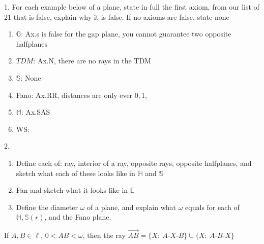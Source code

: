 \documentclass{report}
\begin{document}
    \pagebreak 
    \begin{mdframed}
        1. For each example below of a plane, state in full the first axiom, from our list of 21 that is false, explain why it is false. If no axioms are false, state none 
    \end{mdframed}
    \begin{enumerate}[label=(\alph*)]
        \item \textbf{$\mathbb{G}$}: Ax.s is false for the gap plane, you cannot guarantee two opposite halfplanes
        \item $TDM$: Ax.N, there are no rays in the TDM
        \item $\mathbb{S}$: None
        \item Fano: Ax.RR, distances are only ever $0,1$,
        \item $\mathbb{M}$: Ax.SAS
        \item WS:
    \end{enumerate}

    \bigbreak \noindent 
    \begin{mdframed}
        2. 
        \begin{enumerate}[label=(\alph*)]
            \item Define each of: ray, interior of a ray, opposite rays, opposite halfplanes, and sketch what each of these looks like in $\mathbb{H}$ and $\mathbb{S}$
            \item Fan and sketch what it looks like in $\mathbb{E}$ 
            \item Define the diameter $\omega$ of a plane, and explain what $\omega$ equals for each of $\mathbb{H}, \mathbb{S}(r)$, and the Fano plane.
        \end{enumerate}
    \end{mdframed}
    \bigbreak \noindent 
    If $A,B\in \ell$, $ 0 < AB < \omega$, then the ray $\overrightarrow{AB} = \{X:\ A\text{-}X\text{-}B\} \cup \{X:\ A\text{-}B\text{-}X\} $
\end{document}
